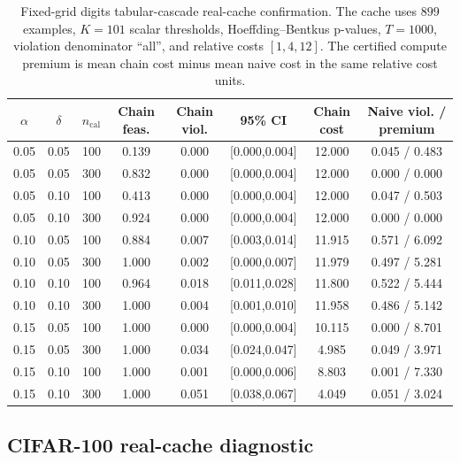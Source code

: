 \documentclass{ieeeaccess}
\begin{document}
\begin{table}[t]
\centering
\caption{Fixed-grid digits tabular-cascade real-cache confirmation. The cache uses $899$ examples, $K=101$ scalar thresholds, Hoeffding--Bentkus p-values, $T=1000$, violation denominator ``all'', and relative costs $[1,4,12]$. The certified compute premium is mean chain cost minus mean naive cost in the same relative cost units.}
\label{tab:digits-confirmatory}
\scriptsize
\setlength{\tabcolsep}{4pt}
\begin{tabular}{@{}cccccccc@{}}
\toprule
$\alpha$ & $\delta$ & $n_{\mathrm{cal}}$ & Chain feas. & Chain viol. & 95\% CI & Chain cost & Naive viol. / premium \\
\midrule
0.05 & 0.05 & 100 & 0.139 & 0.000 & [0.000,0.004] & 12.000 & 0.045 / 0.483 \\
0.05 & 0.05 & 300 & 0.832 & 0.000 & [0.000,0.004] & 12.000 & 0.000 / 0.000 \\
0.05 & 0.10 & 100 & 0.413 & 0.000 & [0.000,0.004] & 12.000 & 0.047 / 0.503 \\
0.05 & 0.10 & 300 & 0.924 & 0.000 & [0.000,0.004] & 12.000 & 0.000 / 0.000 \\
0.10 & 0.05 & 100 & 0.884 & 0.007 & [0.003,0.014] & 11.915 & 0.571 / 6.092 \\
0.10 & 0.05 & 300 & 1.000 & 0.002 & [0.000,0.007] & 11.979 & 0.497 / 5.281 \\
0.10 & 0.10 & 100 & 0.964 & 0.018 & [0.011,0.028] & 11.800 & 0.522 / 5.444 \\
0.10 & 0.10 & 300 & 1.000 & 0.004 & [0.001,0.010] & 11.958 & 0.486 / 5.142 \\
0.15 & 0.05 & 100 & 1.000 & 0.000 & [0.000,0.004] & 10.115 & 0.000 / 8.701 \\
0.15 & 0.05 & 300 & 1.000 & 0.034 & [0.024,0.047] & 4.985 & 0.049 / 3.971 \\
0.15 & 0.10 & 100 & 1.000 & 0.001 & [0.000,0.006] & 8.803 & 0.001 / 7.330 \\
0.15 & 0.10 & 300 & 1.000 & 0.051 & [0.038,0.067] & 4.049 & 0.051 / 3.024 \\
\bottomrule
\end{tabular}
\end{table}

\subsection{CIFAR-100 real-cache diagnostic}
\end{document}
